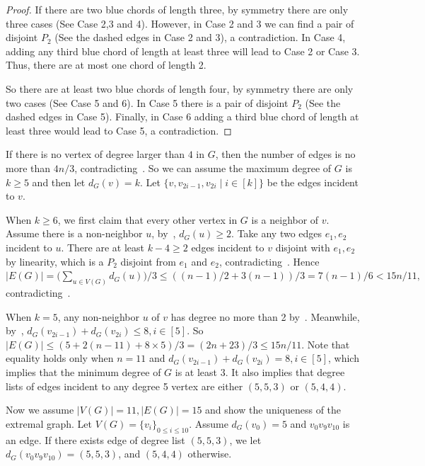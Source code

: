 \documentclass[a4paper]{article}
\newcommand{\emphd}[1]{{\fontseries{b}\selectfont\textsf{#1}}}
\begin{document}
\begin{proof}
If there are two blue chords of length three, by symmetry there are only three cases (See Case 2,3 and 4). However, in Case 2 and 3 we can find a pair of disjoint $P_2$ (See the dashed edges in Case 2 and 3), a contradiction. In Case 4, adding any third blue chord of length at least three will lead to Case 2 or Case 3. Thus, there are at most one chord of length 2.

So there are at least two blue chords of length four, by symmetry there are only two cases (See Case 5 and 6). In Case 5 there is a pair of disjoint $P_2$ (See the dashed edges in Case 5). Finally, in Case 6 adding a third blue chord of length at least three would lead to Case 5, a contradiction. 
\end{proof}

\vspace{0.6cm}

\noindent \emphd{\textit{Proof of~\Cref{main}:}}

If there is no vertex of degree larger than $4$ in $G$, then the number of edges is no more than $4n/3$, contradicting~. So we can assume the maximum degree of $G$ is $k\geq 5$ and then let $d_G(v)=k$. Let $\{v,v_{2i-1},v_{2i}\mid i\in[k]\}$ be the edges incident to $v$.

When $k\geq 6$, we first claim that every other vertex in $G$ is a neighbor of $v$. Assume there is a non-neighbor $u$, by~, $d_G(u)\geq 2$. Take any two edges $e_1,e_2$ incident to $u$. There are at least $k-4\geq 2$ edges incident to $v$ disjoint with $e_1,e_2$ by linearity, which is a $P_2$ disjoint from $e_1$ and $e_2$, contradicting~. Hence $|E (G)|=\big(\sum_{u\in V(G)}d_G(u)\big)/3\leq ((n-1)/2+3(n-1))/3=7(n-1)/6<15n/11,$ contradicting~.

When $k= 5$, any non-neighbor $u$ of $v$ has degree no more than 2 by~. Meanwhile, by~, $d_G(v_{2i-1})+d_G(v_{2i})\leq 8,i\in[5]$. So $|E (G)|\leq (5+2(n-11)+8\times 5)/3 = (2n+23)/3\leq 15n/11$. Note that equality holds only when $n=11$ and $d_G(v_{2i-1})+d_G(v_{2i})= 8, i \in[5]$, which implies that the minimum degree of $G$ is at least 3. It also implies that degree lists of edges incident to any degree 5 vertex are either $(5,5,3)$ or $(5,4,4)$.
\vspace{0.27cm}

Now we assume $|V(G)|=11,|E (G)|=15$ and show the uniqueness of the extremal graph. Let $V(G) = \{v_i\}_{0\le i \le 10}$. Assume $d_G(v_0)=5$ and $v_0v_9v_{10}$ is an edge. If there exists edge of degree list $(5,5,3)$, we let $d_G(v_0v_9v_{10}) = (5,5,3)$, and $(5,4,4)$ otherwise. 
\end{document}
